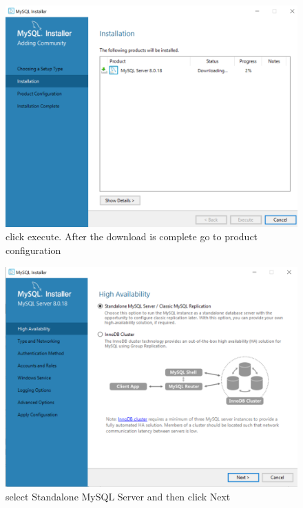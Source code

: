 \begin{figure}[h]
\centering
\includegraphics[width=\textwidth]{Images/mysql-downloading.png}
\caption{\label{fig:fmy} click execute. After the download is complete go to product configuration}
\end{figure} 
\begin{figure}[h]
\centering
\includegraphics[width=\textwidth]{Images/first-mysql.png}
\caption{\label{fig:fmy} select Standalone MySQL Server  and then click Next }
\end{figure} 
